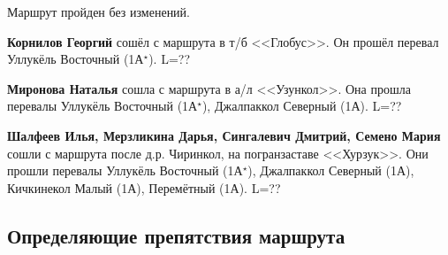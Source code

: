 Маршрут пройден без изменений.

\textbf{Корнилов Георгий} сошёл с маршрута в т/б <<Глобус>>. Он прошёл перевал Уллукёль Восточный (1А$^{\star}$). \alert{L=??}

\textbf{Миронова Наталья} сошла с маршрута в а/л <<Узункол>>. Она прошла перевалы Уллукёль Восточный (1А$^{\star}$), Джалпаккол Северный (1А). \alert{L=??}

\textbf{Шалфеев Илья, Мерзликина Дарья, Сингалевич Дмитрий, Семено Мария} сошли с маршрута после д.р. Чиринкол, на погранзаставе <<Хурзук>>. Они прошли перевалы Уллукёль Восточный (1А$^{\star}$), Джалпаккол Северный (1А), Кичкинекол Малый (1А), Перемётный (1А). \alert{L=??}


\subsection{Определяющие препятствия маршрута}

